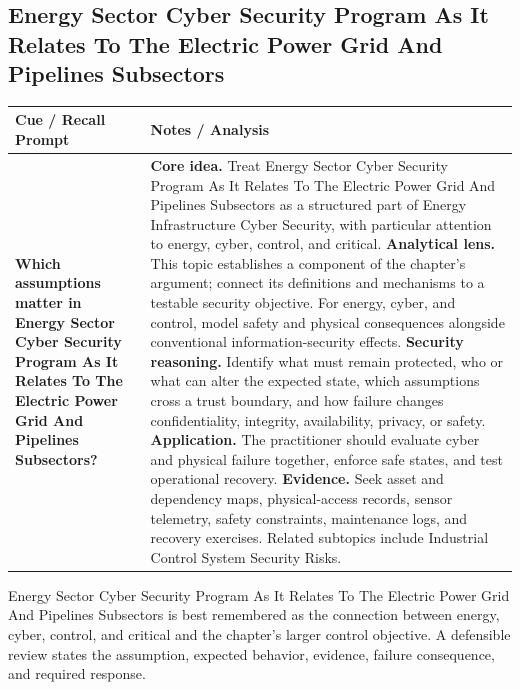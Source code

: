 \documentclass[11pt]{article}
\newcommand{\CornellHeader}{%
\rowcolor{Navy}\color{white}\bfseries Cue / Recall Prompt & \color{white}\bfseries Notes / Analysis\\\hline}
\newcommand{\CornellRow}[2]{%
\cellcolor{CueGray}\RaggedRight\textbf{#1} & \RaggedRight #2\\\hline}
\begin{document}
\subsection*{Energy Sector Cyber Security Program As It Relates To The Electric Power Grid And Pipelines Subsectors}
\begin{longtable}{>{\RaggedRight\arraybackslash}p{}|>{\RaggedRight\arraybackslash}p{}}
\CornellHeader
\CornellRow{Which assumptions matter in Energy Sector Cyber Security Program As It Relates To The Electric Power Grid And Pipelines Subsectors?}{\textbf{Core idea.} Treat Energy Sector Cyber Security Program As It Relates To The Electric Power Grid And Pipelines Subsectors as a structured part of Energy Infrastructure Cyber Security, with particular attention to energy, cyber, control, and critical. \textbf{Analytical lens.} This topic establishes a component of the chapter's argument; connect its definitions and mechanisms to a testable security objective. For energy, cyber, and control, model safety and physical consequences alongside conventional information-security effects. \textbf{Security reasoning.} Identify what must remain protected, who or what can alter the expected state, which assumptions cross a trust boundary, and how failure changes confidentiality, integrity, availability, privacy, or safety. \textbf{Application.} The practitioner should evaluate cyber and physical failure together, enforce safe states, and test operational recovery. \textbf{Evidence.} Seek asset and dependency maps, physical-access records, sensor telemetry, safety constraints, maintenance logs, and recovery exercises. Related subtopics include Industrial Control System Security Risks.}
\end{longtable}
\begin{topicsummary}
Energy Sector Cyber Security Program As It Relates To The Electric Power Grid And Pipelines Subsectors is best remembered as the connection between energy, cyber, control, and critical and the chapter's larger control objective. A defensible review states the assumption, expected behavior, evidence, failure consequence, and required response.
\end{topicsummary}
\end{document}
